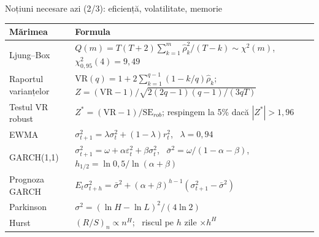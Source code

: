 \begin{frame}{Noțiuni necesare azi (2/3): eficiență, volatilitate, memorie}
\itemsize{\small}
{\renewcommand{\arraystretch}{1.3}\begin{center}
\footnotesize
\begin{tabular}{ll}
\toprule
\textbf{Mărimea} & \textbf{Formula} \\
\midrule
Ljung--Box & $Q(m) = T(T+2)\sum_{k=1}^m \hat\rho_k^2/(T - k) \sim \chi^2(m)$, \ $\chi^2_{0{,}95}(4) = 9{,}49$ \\
Raportul varianțelor & $\mathrm{VR}(q) = 1 + 2\sum_{k=1}^{q-1}(1 - k/q)\hat\rho_k$; \ $Z = (\mathrm{VR} - 1)/\sqrt{2(2q-1)(q-1)/(3qT)}$ \\
Testul VR robust & $Z^* = (\mathrm{VR} - 1)/\mathrm{SE}_{rob}$; respingem la 5\% dacă $|Z^*| > 1{,}96$ \\
EWMA & $\sigma_{t+1}^2 = \lambda\sigma_t^2 + (1 - \lambda)r_t^2$, \ $\lambda = 0{,}94$ \\
GARCH(1,1) & $\sigma_{t+1}^2 = \omega + \alpha\varepsilon_t^2 + \beta\sigma_t^2$, \ $\bar\sigma^2 = \omega/(1 - \alpha - \beta)$, \ $h_{1/2} = \ln 0{,}5/\ln(\alpha + \beta)$ \\
Prognoza GARCH & $E_t\sigma_{t+h}^2 = \bar\sigma^2 + (\alpha + \beta)^{h-1}(\sigma_{t+1}^2 - \bar\sigma^2)$ \\
Parkinson & $\sigma^2 = (\ln H - \ln L)^2/(4\ln 2)$ \\
Hurst & $(R/S)_n \propto n^H$; \ riscul pe $h$ zile $\times h^H$ \\
\bottomrule
\end{tabular}
\end{center}
}
\end{frame}

